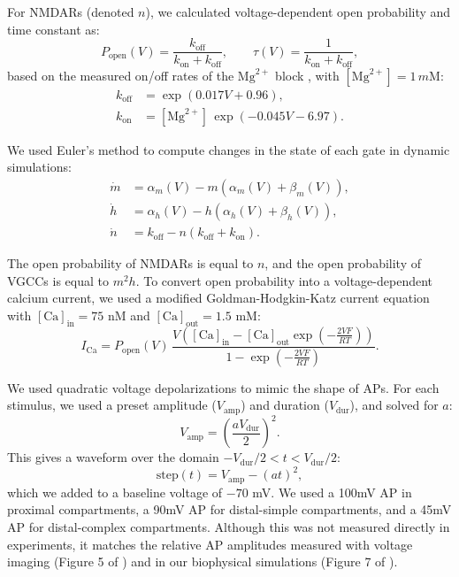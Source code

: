 For NMDARs (denoted $n$), we calculated voltage-dependent open probability and time constant as:
\begin{equation*}
P_{\mathrm{open}}(V) = \frac{k_{\mathrm{off}}}{k_{\mathrm{on}} + k_{\mathrm{off}}}, \qquad
\tau(V) = \frac{1}{k_{\mathrm{on}} + k_{\mathrm{off}}},
\end{equation*}
based on the measured on/off rates of the $\mathrm{Mg}^{2+}$ block \citep{jahrVoltageDependenceNMDAactivated1990}, with $[\mathrm{Mg}^{2+}] = 1\,m\mathrm{M}$:
\begin{align*}
k_{\mathrm{off}} &= \exp(0.017V + 0.96), \\
k_{\mathrm{on}} &= [\mathrm{Mg}^{2+}]\,\exp(-0.045V - 6.97).
\end{align*}

We used Euler's method to compute changes in the state of each gate in dynamic simulations:
\begin{align*}
\dot{m} &= \alpha_m(V) - m\left(\alpha_m(V) + \beta_m(V)\right), \\
\dot{h} &= \alpha_h(V) - h\left(\alpha_h(V) + \beta_h(V)\right), \\
\dot{n} &= k_{\mathrm{off}} - n\left(k_{\mathrm{off}} + k_{\mathrm{on}}\right).
\end{align*}

The open probability of NMDARs is equal to $n$, and the open probability of VGCCs is equal to $m^2h$. To convert open probability into a voltage-dependent calcium current, we used a modified Goldman-Hodgkin-Katz current equation with $[\mathrm{Ca}]_{\mathrm{in}} = 75$ nM and $[\mathrm{Ca}]_{\mathrm{out}} = 1.5$ mM:
\begin{equation*}
I_{\mathrm{Ca}} = P_{\mathrm{open}}(V)\,
\frac{V\left([\mathrm{Ca}]_{\mathrm{in}} - [\mathrm{Ca}]_{\mathrm{out}}\exp\!\left(-\frac{2VF}{RT}\right)\right)}
{1 - \exp\!\left(-\frac{2VF}{RT}\right)}.
\end{equation*}

We used quadratic voltage depolarizations to mimic the shape of APs. For each stimulus, we used a preset amplitude ($V_{\mathrm{amp}}$) and duration ($V_{\mathrm{dur}}$), and solved for $a$:
\begin{equation*}
V_{\mathrm{amp}} = \left(\frac{aV_{\mathrm{dur}}}{2}\right)^2.
\end{equation*}
This gives a waveform over the domain $-V_{\mathrm{dur}}/2 < t < V_{\mathrm{dur}}/2$:
\begin{equation*}
\mathrm{step}(t) = V_{\mathrm{amp}} - (at)^2,
\end{equation*}
which we added to a baseline voltage of $-70$ mV. We used a 100mV AP in proximal compartments, a 90mV AP for distal-simple compartments, and a 45mV AP for distal-complex compartments. Although this was not measured directly in experiments, it matches the relative AP amplitudes measured with voltage imaging (Figure 5 of \citep{landauDendriticBranchStructure2022}) and in our biophysical simulations (Figure 7 of \citep{landauDendriticBranchStructure2022}).

